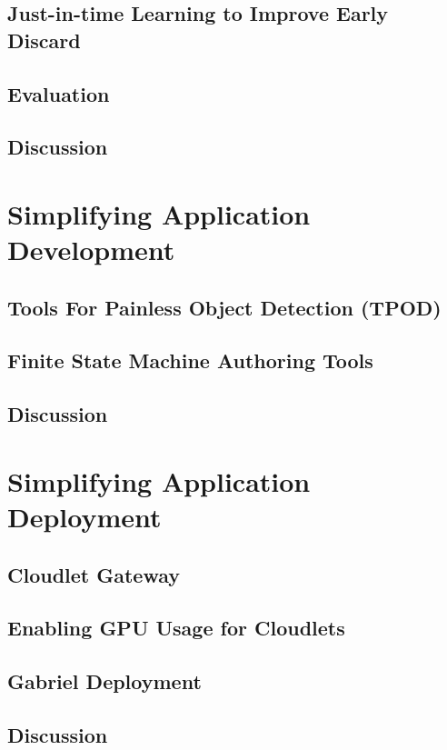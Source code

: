 \subsection{Just-in-time Learning to Improve Early Discard}
\subsection{Evaluation}
\subsection{Discussion}





\section{Simplifying Application Development}
\subsection{Tools For Painless Object Detection (TPOD)}
\subsection{Finite State Machine Authoring Tools}
\subsection{Discussion}

\section{Simplifying Application Deployment}
\subsection{Cloudlet Gateway}
\subsection{Enabling GPU Usage for Cloudlets}
\subsection{Gabriel Deployment}
\subsection{Discussion}

